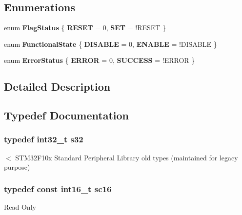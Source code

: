 \subsection*{Enumerations}
\begin{DoxyCompactItemize}
\item 
enum {\bfseries Flag\+Status} \{ {\bfseries R\+E\+S\+ET} = 0, 
{\bfseries S\+ET} = !\+R\+E\+S\+ET
 \}\hypertarget{group___exported__types_ga89136caac2e14c55151f527ac02daaff}{}\label{group___exported__types_ga89136caac2e14c55151f527ac02daaff}

\item 
enum {\bfseries Functional\+State} \{ {\bfseries D\+I\+S\+A\+B\+LE} = 0, 
{\bfseries E\+N\+A\+B\+LE} = !\+D\+I\+S\+A\+B\+LE
 \}\hypertarget{group___exported__types_gac9a7e9a35d2513ec15c3b537aaa4fba1}{}\label{group___exported__types_gac9a7e9a35d2513ec15c3b537aaa4fba1}

\item 
enum {\bfseries Error\+Status} \{ {\bfseries E\+R\+R\+OR} = 0, 
{\bfseries S\+U\+C\+C\+E\+SS} = !\+E\+R\+R\+OR
 \}\hypertarget{group___exported__types_ga8333b96c67f83cba354b3407fcbb6ee8}{}\label{group___exported__types_ga8333b96c67f83cba354b3407fcbb6ee8}

\end{DoxyCompactItemize}


\subsection{Detailed Description}


\subsection{Typedef Documentation}
\subsubsection[{\texorpdfstring{s32}{s32}}]{\setlength{\rightskip}{0pt plus 5cm}typedef int32\+\_\+t {\bf s32}}\hypertarget{group___exported__types_gae9b1af5c037e57a98884758875d3a7c4}{}\label{group___exported__types_gae9b1af5c037e57a98884758875d3a7c4}
$<$ S\+T\+M32\+F10x Standard Peripheral Library old types (maintained for legacy purpose) 
\subsubsection[{\texorpdfstring{sc16}{sc16}}]{\setlength{\rightskip}{0pt plus 5cm}typedef const int16\+\_\+t {\bf sc16}}\hypertarget{group___exported__types_ga66ab742a0751bb4e7661b8e874f2ddda}{}\label{group___exported__types_ga66ab742a0751bb4e7661b8e874f2ddda}
Read Only 
